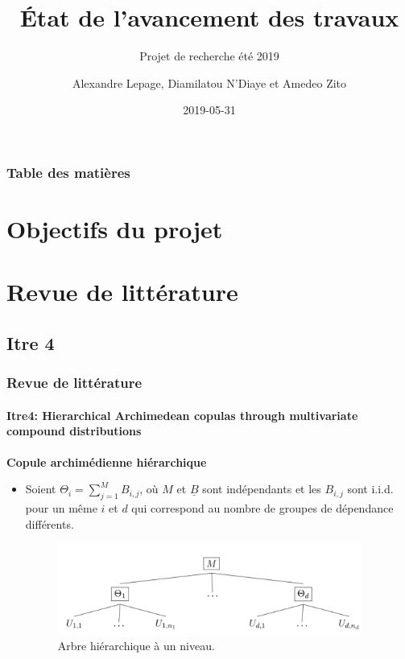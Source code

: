 \documentclass[11pt]{beamer}
\title[]{État de l'avancement des travaux}
\subtitle[]{Projet de recherche été 2019}
\author[Lepage A., N'Diaye D. et Zito A.]{Alexandre Lepage, Diamilatou N'Diaye \newline et Amedeo Zito}
\institute[ULaval] %
{
  École d'actuariat \\
  Université Laval, Québec, Canada \\
}
\date{2019-05-31} %
\begin{document}
\begin{frame}[label=titre, plain]
\titlepage
\end{frame}


\begin{frame}[allowframebreaks]
	\frametitle{Table des matières}
	\tableofcontents
\end{frame}


\section{Objectifs du projet}


\section{Revue de littérature}
\subsection{Itre 4}
\begin{frame}
	\frametitle{Revue de littérature}
	\framesubtitle{Itre4: Hierarchical Archimedean copulas through multivariate compound
		distributions \cite{Itre4}}
	
	\textbf{Copule archimédienne hiérarchique}
	
	\begin{itemize}
		\item Soient $\Theta_i = \sum_{j=1}^{M} B_{i,j}$, où $M$ et $\underline{B}$ sont indépendants et les $B_{i,j}$ sont i.i.d. pour un même $i$ et $d$ qui correspond au nombre de groupes de dépendance différents.
		\begin{figure}[H]
			\centering
			\includegraphics[height=3cm]{Hierarchie_1}
			\renewcommand{\figurename}{Illustration}
			\caption{Arbre hiérarchique à un niveau.} \label{hierarchie}
		\end{figure}
	
	\end{itemize}
\end{frame}
\end{document}
